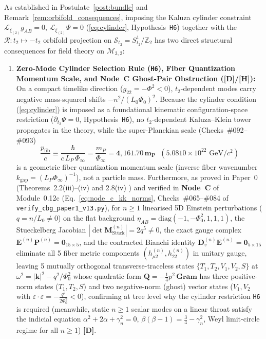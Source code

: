\documentclass[11pt,a4paper]{article}
\newcommand{\catD}{\textbf{\textcolor{blue!75!black}{[D]}}}
\newcommand{\catH}{\textbf{\textcolor{orange!85!black}{[H]}}}
\theoremstyle{definition}
\theoremstyle{remark}
\begin{document}
As established in Postulate~\ref{post:bundle} and Remark~\ref{rem:orbifold_consequences}, imposing the Kaluza cylinder constraint $\mathcal{L}_{\xi_{(2)}}g_{AB} = 0, \, \mathcal{L}_{\xi_{(2)}}\Psi = 0$ (\ref{eq:cylinder}, Hypothesis~\texttt{H6}) together with the $\mathcal{R}: t_2 \mapsto -t_2$ orbifold projection on $\mathcal{S}_{t_2} = S^1_{t_2}/\mathbb{Z}_2$ has two direct structural consequences for field theory on $\mathcal{M}_{3,2}$:
\begin{enumerate}
  \item[\textnormal{(i)}] \textbf{Zero-Mode Cylinder Selection Rule (\texttt{H6}), Fiber Quantization Momentum Scale, and Node~C Ghost-Pair Obstruction (\catD/\catH):} On a compact timelike direction ($g_{22} = -\Phi^2 < 0$), $t_2$-dependent modes carry negative mass-squared shifts $-n^2/(L_0\Phi_0)^2$. Because the cylinder condition (\ref{eq:cylinder}) is imposed as a foundational kinematic configuration-space restriction ($\partial_{t_2}\Psi = 0$, Hypothesis~\texttt{H6}), no $t_2$-dependent Kaluza--Klein tower propagates in the theory, while the super-Planckian scale (Checks~\#092--\#093)
  \begin{equation}
    \frac{p_{\text{fib}}}{c} \equiv \frac{\hbar}{c\,L_P\,\Phi_{\infty}} = \frac{m_P}{\Phi_{\infty}} = \mathbf{4{,}161.70\,m_P} \;\; \left(5.0810 \times 10^{22}\text{ GeV}/c^2\right)
    \label{eq:kk_dispersion_exact}
  \end{equation}
  is a geometric fiber quantization momentum scale (inverse fiber wavenumber $k_{\text{gap}} = (L_P\Phi_\infty)^{-1}$), not a particle mass. Furthermore, as proved in Paper~0 (Theorems~2.2(iii)--(iv) and 2.8(iv) \cite{JV_Paper0}) and verified in \textbf{Node~C} of Module~0.12c (Eq.~\ref{eq:node_c_kk_norms}, Checks~\#065--\#084 of \texttt{verify\_cbg\_paper1\_v13.py}), for $n \ge 1$ linearised 5D Einstein perturbations ($q = n/L_0 \neq 0$) on the flat background $\eta_{AB} = \text{diag}(-1, -\Phi_0^2, 1, 1, 1)$, the Stueckelberg Jacobian $|\det\mathbf{M}_{\text{St\"uck}}^{(n)}| = 2 q^5 \neq 0$, the exact gauge complex $\mathbf{E}^{(n)}\mathbf{P}^{(n)} = \mathbf{0}_{15\times 5}$, and the contracted Bianchi identity $\mathbf{D}_v^{(n)}\mathbf{E}^{(n)} = \mathbf{0}_{5\times 15}$ eliminate all 5 fiber metric components $(h_{\mu 2}^{(n)}, h_{22}^{(n)})$ in unitary gauge, leaving 5 mutually orthogonal transverse-traceless states $\{T_1, T_2, V_1, V_2, S\}$ at $\omega^2 = |\mathbf{k}|^2 - q^2/\Phi_0^2$ whose quadratic form $\mathbf{Q} = -\frac{1}{4}p^2\,\mathbf{Gram}$ has three positive-norm states ($T_1, T_2, S$) and two negative-norm (ghost) vector states ($V_1, V_2$ with $\varepsilon\cdot\varepsilon = -\frac{q^2}{2\Phi_0^2} < 0$), confirming at tree level why the cylinder restriction \texttt{H6} is required (meanwhile, static $n \ge 1$ scalar modes on a linear throat satisfy the indicial equation $\alpha^2 + 2\alpha + \gamma_n^2 = 0$, $\beta(\beta - 1) = \frac{3}{4} - \gamma_n^2$, Weyl limit-circle regime for all $n \ge 1$) \catD.

\end{enumerate}
\end{document}
